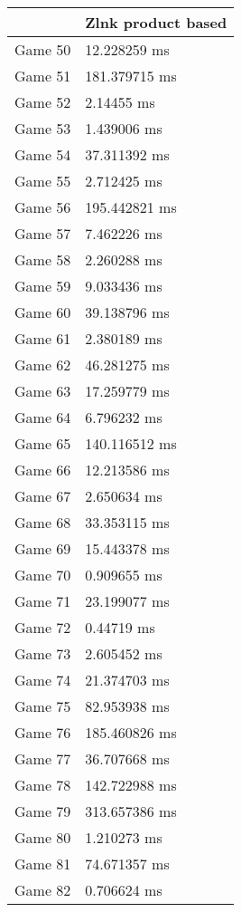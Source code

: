\begin{multicols}{2}
\begin{tabular}{|l|l|}
	\hline
	& Zlnk product based \\ \hline
	Game 50 & 12.228259 ms \\ \hline
	Game 51 & 181.379715 ms \\ \hline
	Game 52 & 2.14455 ms \\ \hline
	Game 53 & 1.439006 ms \\ \hline
	Game 54 & 37.311392 ms \\ \hline
	Game 55 & 2.712425 ms \\ \hline
	Game 56 & 195.442821 ms \\ \hline
	Game 57 & 7.462226 ms \\ \hline
	Game 58 & 2.260288 ms \\ \hline
	Game 59 & 9.033436 ms \\ \hline
	Game 60 & 39.138796 ms \\ \hline
	Game 61 & 2.380189 ms \\ \hline
	Game 62 & 46.281275 ms \\ \hline
	Game 63 & 17.259779 ms \\ \hline
	Game 64 & 6.796232 ms \\ \hline
	Game 65 & 140.116512 ms \\ \hline
	Game 66 & 12.213586 ms \\ \hline
	Game 67 & 2.650634 ms \\ \hline
	Game 68 & 33.353115 ms \\ \hline
	Game 69 & 15.443378 ms \\ \hline
	Game 70 & 0.909655 ms \\ \hline
	Game 71 & 23.199077 ms \\ \hline
	Game 72 & 0.44719 ms \\ \hline
	Game 73 & 2.605452 ms \\ \hline
	Game 74 & 21.374703 ms \\ \hline
	Game 75 & 82.953938 ms \\ \hline
	Game 76 & 185.460826 ms \\ \hline
	Game 77 & 36.707668 ms \\ \hline
	Game 78 & 142.722988 ms \\ \hline
	Game 79 & 313.657386 ms \\ \hline
	Game 80 & 1.210273 ms \\ \hline
	Game 81 & 74.671357 ms \\ \hline
	Game 82 & 0.706624 ms \\ \hline

\end{tabular}
\end{multicols}
